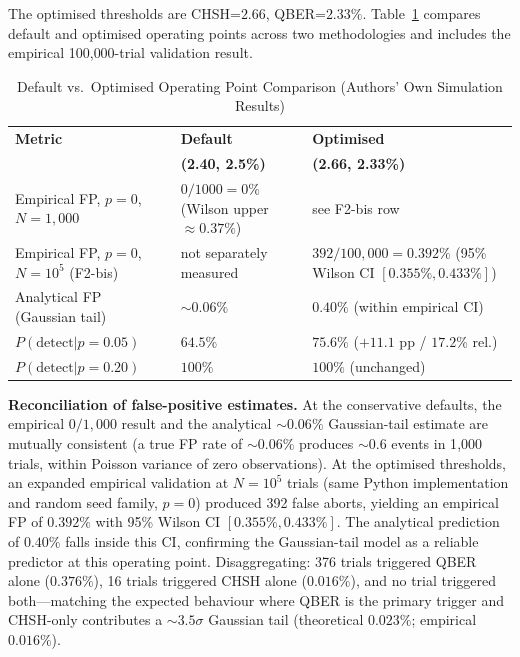 \documentclass[conference]{IEEEtran}
\begin{document}
The optimised thresholds are CHSH=$2.66$, QBER=$2.33\%$. Table~\ref{tab:thresholdcompare} compares default and optimised operating points across two methodologies and includes the empirical 100{,}000-trial validation result.

\begin{table}[!t]
\caption{Default vs.\ Optimised Operating Point Comparison (Authors' Own Simulation Results)}
\label{tab:thresholdcompare}
\centering
\small
\begin{tabular}{@{}p{3.1cm}p{2.0cm}p{2.0cm}@{}}
\toprule
\textbf{Metric} & \textbf{Default} & \textbf{Optimised} \\
& \textbf{(2.40, 2.5\%)} & \textbf{(2.66, 2.33\%)} \\
\midrule
Empirical FP, $p=0$, $N=1{,}000$ & $0/1000 = 0\%$ (Wilson upper $\approx 0.37\%$) & see F2-bis row \\
\midrule
Empirical FP, $p=0$, $N=10^5$ (F2-bis) & not separately measured & $392/100{,}000 = 0.392\%$ (95\% Wilson CI $[0.355\%, 0.433\%]$) \\
\midrule
Analytical FP (Gaussian tail) & $\sim 0.06\%$ & $0.40\%$ (within empirical CI) \\
\midrule
$P(\mathrm{detect} | p = 0.05)$ & $64.5\%$ & $75.6\%$ ($+11.1$ pp / $17.2\%$ rel.) \\
\midrule
$P(\mathrm{detect} | p = 0.20)$ & $100\%$ & $100\%$ (unchanged) \\
\bottomrule
\end{tabular}
\end{table}

\textbf{Reconciliation of false-positive estimates.} At the conservative defaults, the empirical $0/1{,}000$ result and the analytical $\sim 0.06\%$ Gaussian-tail estimate are mutually consistent (a true FP rate of $\sim 0.06\%$ produces $\sim 0.6$ events in 1{,}000 trials, within Poisson variance of zero observations). At the optimised thresholds, an expanded empirical validation at $N = 10^5$ trials (same Python implementation and random seed family, $p = 0$) produced 392 false aborts, yielding an empirical FP of $0.392\%$ with 95\% Wilson CI $[0.355\%, 0.433\%]$. The analytical prediction of $0.40\%$ falls inside this CI, confirming the Gaussian-tail model as a reliable predictor at this operating point. Disaggregating: 376 trials triggered QBER alone ($0.376\%$), 16 trials triggered CHSH alone ($0.016\%$), and no trial triggered both---matching the expected behaviour where QBER is the primary trigger and CHSH-only contributes a $\sim 3.5\sigma$ Gaussian tail (theoretical $0.023\%$; empirical $0.016\%$).
\end{document}
